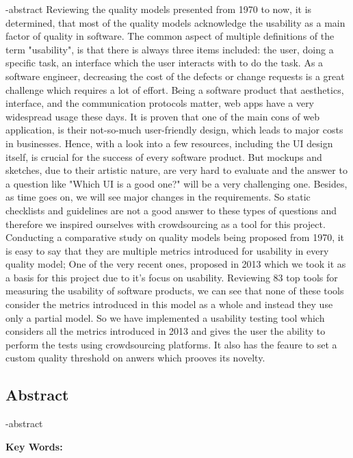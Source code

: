 
\en-abstract{
Reviewing the quality models presented from 1970 to now, it is determined, that most of the quality models acknowledge the usability as a main factor of quality in software. The common aspect of multiple definitions of the term "usability", is that there is always three items included: the user, doing a specific task, an interface which the user interacts with to do the task. As a software engineer, decreasing the cost of the defects or change requests is a great challenge which requires a lot of effort. Being a software product that aesthetics, interface, and the communication protocols matter, web apps have a very widespread usage these days. It is proven that one of the main cons of web application, is their not-so-much user-friendly design, which leads to major costs in businesses. Hence, with a look into a few resources, including the UI design itself, is crucial for the success of every software product. But mockups and sketches, due to their artistic nature, are very hard to evaluate and the answer to a question like "Which UI is a good one?" will be a very challenging one. Besides, as time goes on, we will see major changes in the requirements. So static checklists and guidelines are not a good answer to these types of questions and therefore we inspired ourselves with crowdsourcing as a tool for this project. Conducting a comparative study on quality models being proposed from 1970, it is easy to say that they are multiple metrics introduced for usability in every quality model; One of the very recent ones, proposed in 2013 which we took it as a basis for this project due to it's focus on usability. Reviewing 83 top tools for measuring the usability of software products, we can see that none of these tools consider the metrics introduced in this model as a whole and instead they use only a partial model. So we have implemented a usability testing tool which considers all the metrics introduced in 2013 and gives the user the ability to perform the tests using crowdsourcing platforms. It also has the feaure to set a custom quality threshold on anwers which prooves its novelty.
}

\newpage
\thispagestyle{empty}
\begin{latin}
\section*{\LARGE\centering Abstract}
\een-abstract

\vspace*{.5cm}
{\large\textbf{Key Words:}}\par
\elatinkeywords
\end{latin}